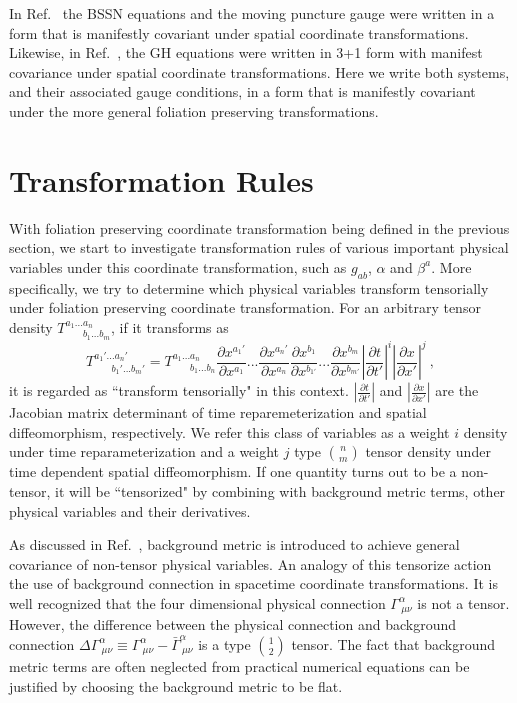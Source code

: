 In Ref.~\cite{Brown:2009dd} the BSSN equations and the moving puncture gauge were written in a form that is manifestly covariant under spatial coordinate transformations. 
Likewise, in Ref.~\cite{Brown:2011qg}, the GH equations were written in 3+1 form with manifest covariance 
under spatial coordinate transformations.  Here we write both systems, and their associated gauge conditions, in a form 
that is manifestly covariant under the more general foliation preserving transformations. 

\section{Transformation Rules}\label{transform}
With foliation preserving coordinate transformation being defined in the previous section, we start to investigate transformation rules of various important physical variables under this coordinate transformation, such as $g_{ab}$, $\alpha$ and $\beta^{a}$. More specifically, we try to determine which physical variables transform tensorially under foliation preserving coordinate transformation. For an arbitrary tensor density $T^{a_{1}...a_{n}}_{~~~~~~~~b_{1}...b_{m}}$, if it transforms as
\begin{equation}
	T^{a_{1}'...a_{n}'}_{~~~~~~~~b_{1}'...b_{m}'} = T^{a_{1}...a_{n}}_{~~~~~~~~b_{1}...b_{n}}\frac{\partial x^{a_{1}'}}{\partial x^{a_{1}}}...\frac{\partial x^{a_{n}'}}{\partial x^{a_{n}}}\frac{\partial x^{b_{1}}}{\partial x^{b_{1'}}}...\frac{\partial x^{b_{m}}}{\partial x^{b_{m'}}}\left|\frac{\partial t}{\partial t'}\right|^{i}\left|\frac{\partial x}{\partial x'}\right|^{j} \ ,
\end{equation}
it is regarded as ``transform tensorially" in this context. $\left|\frac{\partial t}{\partial t'}\right|$ and $\left|\frac{\partial x}{\partial x'}\right|$ are the Jacobian matrix determinant of time reparemeterization and spatial diffeomorphism, respectively. We refer this class of variables as a weight $i$ density under time reparameterization and a weight $j$ type $n \choose m$ tensor density under time dependent spatial diffeomorphism. If one quantity turns out to be a non-tensor, it will be ``tensorized" by combining with background metric terms, other physical variables and their derivatives. 

As discussed in Ref.~\cite{Brown:2010rya, Brown:2011qg}, background metric is introduced to achieve general covariance of non-tensor physical variables. An analogy of this tensorize action the use of background connection in spacetime coordinate transformations. It is well recognized that the four dimensional physical connection $\Gamma^{\alpha}_{~\mu\nu}$ is not a tensor. However, the difference between the physical connection and background connection $\Delta \Gamma^{\alpha}_{~\mu\nu} \equiv \Gamma^{\alpha}_{~\mu\nu} - {\bar \Gamma}^{\alpha}_{~\mu\nu}$ is a type $1 \choose 2$ tensor. The fact that background metric terms are often neglected from practical numerical equations can be justified by choosing the background metric to be flat. 

